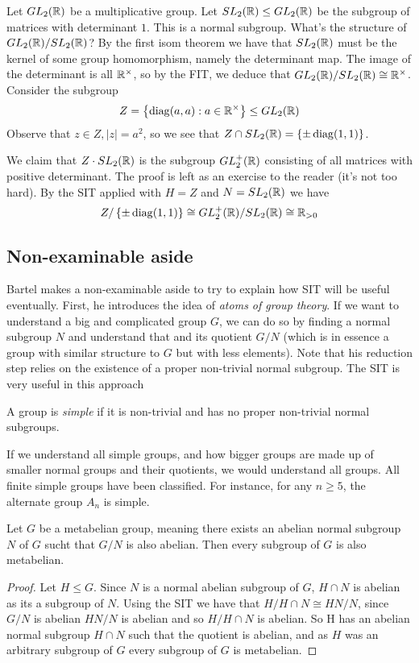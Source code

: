 \begin{example}
  Let $GL_2(\mathbb R)$ be a multiplicative group. Let $SL_2(\mathbb R)\leq GL_2(\mathbb R)$ be the subgroup
  of matrices with determinant $1$. This is a normal subgroup. What's the structure of
  $GL_2(\mathbb R)/SL_2(\mathbb R)$? By the first isom theorem we have that $SL_2(\mathbb R)$ must be the
  kernel of some group homomorphism, namely the determinant map. The image of the
  determinant is all $\mathbb R^{\times}$, so by the FIT, we deduce that
  $GL_2(\mathbb R)/SL_2(\mathbb R)\cong \mathbb R^{\times}$. Consider the subgroup
  \[Z= \left\{ \operatorname*{diag} (a,a) : a\in \mathbb R^{\times} \right\} \leq GL_{2}(\mathbb R)\]
  Observe that $z\in Z, |z|=a^2$, so we see that $Z\cap SL_{2}(\mathbb R) = \left\{ \pm
  \operatorname*{diag}(1,1) \right\}$. 

  We claim that $Z\cdot SL_2(\mathbb R)$ is the subgroup $GL_2^+(\mathbb R)$
  consisting of all matrices with positive determinant. The proof is left as an exercise
  to the reader (it's not too hard). By the SIT applied with $H=Z$ and $N=SL_2(\mathbb R)$ we
  have
  \[ Z/\left\{ \pm \operatorname*{diag}(1,1) \right\} \cong GL_2^+(\mathbb R)/ SL_2(\mathbb R) \cong \mathbb R_{>0}\]

\end{example}

\subsection{Non-examinable aside}
Bartel makes a non-examinable aside to try to explain how SIT will be useful eventually.
First, he introduces the idea of \emph{atoms of group theory}. If we want to understand a
big and complicated group $G$, we can do so by finding a normal subgroup $N$ and
understand that and its quotient $G/N$ (which is in essence a group with similar structure
to $G$ but with less elements). Note that his reduction step relies on the existence of a
proper non-trivial normal subgroup. The SIT is very useful in this approach
\begin{definition}
  A group is \emph{simple} if it is non-trivial and has no proper non-trivial normal
  subgroups.
\end{definition}

If we understand all simple groups, and how bigger groups are made up of smaller normal
groups and their quotients, we would understand all groups. All finite simple groups have
been classified. For instance, for any $n\geq 5$, the alternate group $A_n$ is simple.

\begin{theorem}
  Let $G$ be a metabelian group, meaning there exists an abelian normal subgroup $N$ of
  $G$ sucht that $G/N$ is also abelian. Then every subgroup of $G$ is also metabelian.
  \label{<+label+>}
\end{theorem}

\begin{proof}
    Let $H \leq G$. Since $N$ is a normal abelian subgroup of $G$, $H \cap N$ is abelian as its a subgroup of $N$. Using the SIT we have that $H/H \cap N \cong HN/N$, since $G/N$ is abelian $HN/N$ is abelian and so $H/H \cap N$ is abelian. So H has an abelian normal subgroup $H \cap N$ such that the quotient is abelian, and as $H$ was an arbitrary subgroup of $G$ every subgroup of $G$ is metabelian.
\end{proof}
